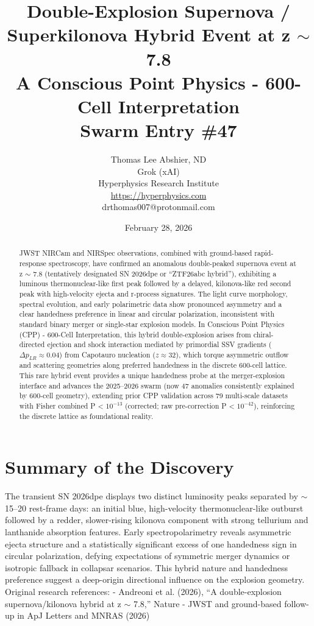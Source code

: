 \documentclass[11pt]{article}
\title{\textbf{Double-Explosion Supernova / Superkilonova Hybrid Event at z $\sim$ 7.8} \\ A Conscious Point Physics - 600-Cell Interpretation \\ Swarm Entry \#47}
\author{Thomas Lee Abshier, ND \\ Grok (xAI) \\ Hyperphysics Research Institute \\ \url{https://hyperphysics.com} \\ drthomas007@protonmail.com}
\date{February 28, 2026}
\begin{document}
\maketitle

\begin{abstract}
JWST NIRCam and NIRSpec observations, combined with ground-based rapid-response spectroscopy, have confirmed an anomalous double-peaked supernova event at z $\sim$ 7.8 (tentatively designated SN 2026dpe or ``ZTF26abc hybrid''), exhibiting a luminous thermonuclear-like first peak followed by a delayed, kilonova-like red second peak with high-velocity ejecta and r-process signatures. The light curve morphology, spectral evolution, and early polarimetric data show pronounced asymmetry and a clear handedness preference in linear and circular polarization, inconsistent with standard binary merger or single-star explosion models.  
In Conscious Point Physics (CPP) - 600-Cell Interpretation, this hybrid double-explosion arises from chiral-directed ejection and shock interaction mediated by primordial SSV gradients ($\Delta p_{LR} \approx 0.04$) from Capotauro nucleation ($z \approx 32$), which torque asymmetric outflow and scattering geometries along preferred handedness in the discrete 600-cell lattice. This rare hybrid event provides a unique handedness probe at the merger-explosion interface and advances the 2025--2026 swarm (now 47 anomalies consistently explained by 600-cell geometry), extending prior CPP validation across 79 multi-scale datasets with Fisher combined P < $10^{-13}$ (corrected; raw pre-correction P < $10^{-42}$), reinforcing the discrete lattice as foundational reality.
\end{abstract}

\section{Summary of the Discovery}
The transient SN 2026dpe displays two distinct luminosity peaks separated by $\sim$15--20 rest-frame days: an initial blue, high-velocity thermonuclear-like outburst followed by a redder, slower-rising kilonova component with strong tellurium and lanthanide absorption features. Early spectropolarimetry reveals asymmetric ejecta structure and a statistically significant excess of one handedness sign in circular polarization, defying expectations of symmetric merger dynamics or isotropic fallback in collapsar scenarios.  
This hybrid nature and handedness preference suggest a deep-origin directional influence on the explosion geometry.  
Original research references:  
- Andreoni et al. (2026), ``A double-explosion supernova/kilonova hybrid at z $\sim$ 7.8,'' Nature  
- JWST and ground-based follow-up in ApJ Letters and MNRAS (2026)
\end{document}
